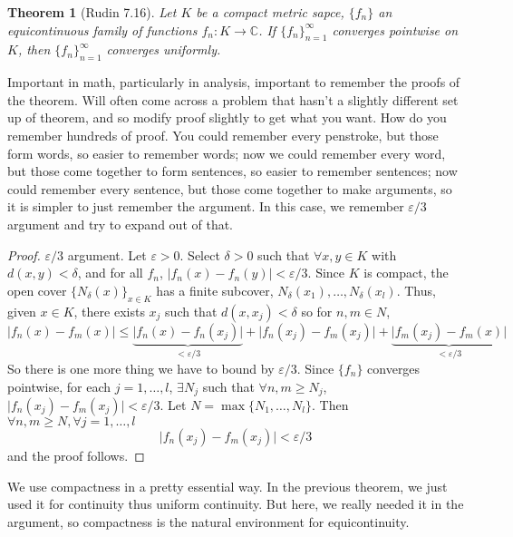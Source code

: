 \documentclass{article}
\theoremstyle{plain}
\newtheorem{theorem}{Theorem}
\theoremstyle{remark}
\newcommand{\C}{{\mathbb C}}
\newcommand{\ep}{{\varepsilon}}
\begin{document}
\begin{theorem}[Rudin 7.16]
	Let $K$ be a compact metric sapce,
	$\{f_n\}$ an equicontinuous family of functions $f_n \colon K \to \C$.
	If $\{f_n\}_{n=1}^\infty$ converges pointwise on $K$,
	then $\{f_n\}_{n=1}^\infty$ converges uniformly.
\end{theorem}
Important in math, particularly in analysis,
important to remember the proofs of the theorem.
Will often come across a problem that hasn't a slightly different set up of theorem,
and so modify proof slightly to get what you want.
How do you remember hundreds of proof.
You could remember every penstroke, but those form words, so easier to remember words;
now we could remember every word, but those come together to form sentences,
so easier to remember sentences;
now could remember every sentence, but those come together to make arguments,
so it is simpler to just remember the argument.
In this case, we remember $\ep / 3$ argument and try to expand out of that.
\begin{proof}
	$\ep / 3$ argument.
	Let $\ep > 0$. Select $\delta > 0$ such that $\forall x,y \in K$
	with $d(x,y) < \delta$, and for all $f_n$, $\lvert f_n(x) - f_n(y)\rvert < \ep/3$.
	Since $K$ is compact, the open cover $\{N_\delta (x)\}_{x \in K}$ has
	a finite subcover, $N_\delta(x_1),\dots,N_\delta(x_l)$.
	Thus, given $x \in K$, there exists $x_j$ such that
	$d(x,x_j) < \delta$ so for $n,m \in N$,
	\[
		\lvert f_n(x) - f_m(x) \rvert \leq
		\underbrace{\lvert f_n(x) - f_n(x_j) \rvert}_{<\ep/3}
		+ \lvert f_n(x_j) - f_m(x_j) \rvert + 
		\underbrace{\lvert f_m(x_j) - f_m(x)\rvert}_{<\ep/3}
	\]
	So there is one more thing we have to bound by $\ep / 3$.
	Since $\{f_n\}$ converges pointwise,
	for each $j = 1, \dots, l$, $\exists N_j$ such that $\forall n,m \geq N_j$,
	$\lvert f_n(x_j) - f_m(x_j) \rvert < \ep/3$.
	Let $N = \max\{N_1,\dots,N_l\}$.
	Then $\forall n,m \geq N, \forall j = 1,\dots, l$
	\[
		\lvert f_n(x_j) - f_m(x_j) \rvert < \ep/3
	\]
	and the proof follows.
\end{proof}
We use compactness in a pretty essential way.
In the previous theorem, we just used it for continuity thus uniform continuity.
But here, we really needed it in the argument,
so compactness is the natural environment for equicontinuity.
\end{document}
